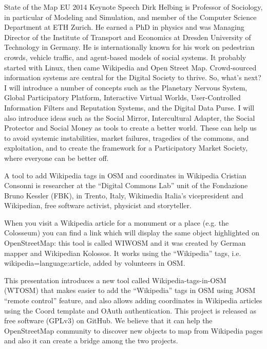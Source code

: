 %
{State of the Map EU 2014 Keynote Speech}%
{Dirk Helbing is Professor of Sociology, in particular of Modeling and 
Simulation, and member of the Computer Science Department at ETH Zurich. 
He earned a PhD in physics and was Managing Director of the Institute of 
Transport and Economics at Dresden University of Technology in Germany. 
He is internationally known for his work on pedestrian crowds, vehicle 
traffic, and agent-based models of social systems.  }%
{It probably started with Linux, then came Wikipedia and Open Street Map. 
Crowd-sourced information systems
are central for the Digital Society to thrive. So, what's next? 
I will introduce a number of concepts such as
the Planetary Nervous System, Global Participatory Platform, 
Interactive Virtual Worlds, User-Controlled
Information Filters and Reputation Systems, and the Digital Data Purse. 
I will also introduce ideas such as the Social Mirror, 
Intercultural Adapter, 
the Social Protector and Social Money as tools to create a better world. 
These can help us to avoid systemic instabilities, market failures, 
tragedies of the commons, and exploitation, and to create the framework 
for a Participatory Market Society, where everyone can be better off.}


%
{A tool to add Wikipedia tags in OSM and coordinates in Wikipedia}%
{Cristian Consonni is researcher at the ``Digital Commons Lab'' unit of the Fondazione Bruno Kessler (FBK), in Trento, Italy, Wikimedia Italia's vicepresident and Wikipedian, free software activist, physicist and storyteller.}%
{When you visit a Wikipedia article for a monument or a place (e.g. the Colosseum) you can find a link which will display the same object highlighted on OpenStreetMap: this tool is called WIWOSM and it was created by German mapper and Wikipedian Kolossos. It works using the ``Wikipedia'' tags, i.e. wikipedia=language:article, added by volunteers in OSM.

This presentation introduces a new tool called Wikipedia-tags-in-OSM (WTOSM) that makes easier to add the ``Wikipedia'' tags in OSM using JOSM ``remote control'' feature, and also allows adding coordinates in Wikipedia articles using the {{Coord}} template and OAuth authentication. This project is released as free software (GPLv3) on GitHub. We believe that it can help the OpenStreetMap community to discover new objects to map from Wikipedia pages and also it can create a bridge among the two projects.}

